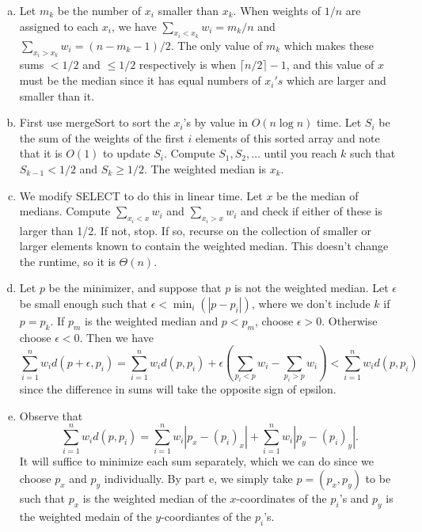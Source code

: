\documentclass{article}
\begin{document}
\begin{enumerate}[a.]
\item Let $m_k$ be the number of $x_i$ smaller than $x_k$.  When weights of $1/n$ are assigned to each $x_i$, we have $\sum_{x_i < x_k} w_i = m_k/n$ and $\sum_{x_i > x_k} w_i = (n-m_k-1)/2$.  The only value of $m_k$ which makes these sums $<1/2$ and $\leq 1/2$ respectively is when $\lceil n/2 \rceil - 1$, and this value of $x$ must be the median since it has equal numbers of $x_i's$ which are larger and smaller than it. \\

\item First use mergeSort to sort the $x_i$'s by value in $O(n \log n)$ time.  Let $S_i$ be the sum of the weights of the first $i$ elements of this sorted array and note that it is $O(1)$ to update $S_i$.  Compute $S_1, S_2, \ldots$ until you reach $k$ such that $S_{k-1}<1/2$ and $S_k \geq 1/2$.  The weighted median is $x_k$. \\

\item We modify SELECT to do this in linear time.  Let $x$ be the median of medians.  Compute $\sum_{x_i < x}w_i$ and $\sum_{x_i > x}w_i$ and check if either of these is larger than 1/2.  If not, stop.  If so, recurse on the collection of smaller or larger elements known to contain the weighted median. This doesn't change the runtime, so it is $\Theta(n)$. \\

\item Let $p$ be the minimizer, and suppose that $p$ is not the weighted median.  Let $\epsilon$ be small enough such that $\epsilon < \min_{i}(|p-p_i|)$, where we don't include $k$ if $p = p_k$.  If $p_m$ is the weighted median and $p < p_m$, choose $\epsilon > 0$.  Otherwise choose $\epsilon < 0$.  Then we have
\[ \sum_{i=1}^n w_i d(p+\epsilon, p_i) = \sum_{i=1}^n w_i d(p,p_i) + \epsilon \left( \sum_{p_i < p} w_i - \sum_{p_i > p} w_i \right) < \sum_{i=1}^n w_i d(p, p_i) \]
since the difference in sums will take the opposite sign of epsilon. \\

\item Observe that 
\[ \sum_{i=1}^n w_i d(p, p_i) = \sum_{i=1}^n w_i|p_x - (p_i)_x| + \sum_{i=1}^n w_i|p_y - (p_i)_y|.\]
It will suffice to minimize each sum separately, which we can do since we choose $p_x$ and $p_y$ individually.  By part e, we simply take $p = (p_x, p_y)$ to be such that $p_x$ is the weighted median of the $x$-coordinates of the $p_i$'s and $p_y$ is the weighted medain of the $y$-coordiantes of the $p_i$'s.\\

\end{enumerate}
\end{document}

